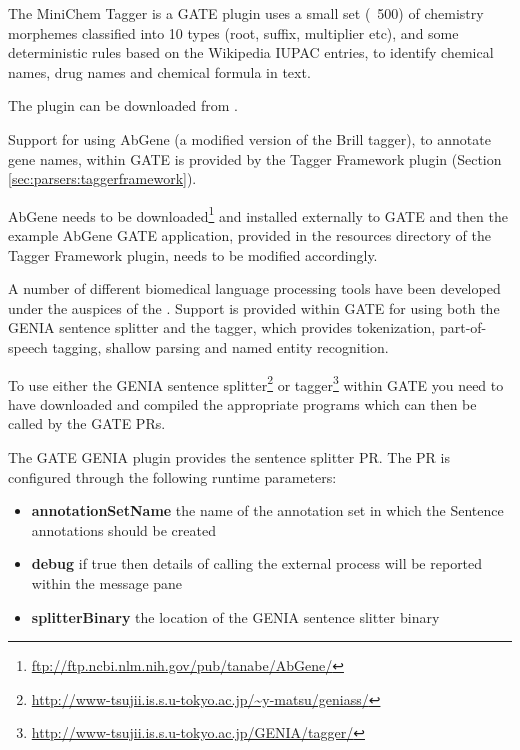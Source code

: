 The MiniChem Tagger is a GATE plugin uses a small set (~500) of chemistry morphemes classified into 10 types (root, suffix, multiplier etc), and some deterministic rules based on the Wikipedia IUPAC entries, to identify chemical names, drug names and chemical formula in text.

The plugin can be downloaded from .

Support for using AbGene \cite{Tanabe02} (a modified version of the Brill tagger), to annotate gene names,
within GATE is provided by the Tagger Framework plugin (Section \ref{sec:parsers:taggerframework}). 

AbGene needs to be downloaded\footnote{\url{ftp://ftp.ncbi.nlm.nih.gov/pub/tanabe/AbGene/}}
and installed externally to GATE and then the example AbGene GATE application, provided
in the resources directory of the Tagger Framework plugin, needs to be modified accordingly.



A number of different biomedical language processing tools have been developed under the auspices of the
. Support is provided within GATE
for using both the GENIA sentence splitter and the tagger, which provides tokenization, part-of-speech tagging,
shallow parsing and named entity recognition.

To use either the GENIA sentence splitter\footnote{\url{http://www-tsujii.is.s.u-tokyo.ac.jp/~y-matsu/geniass/}}
or tagger\footnote{\url{http://www-tsujii.is.s.u-tokyo.ac.jp/GENIA/tagger/}} within GATE you need to have downloaded
and compiled the appropriate programs which can then be called by the GATE PRs.

The GATE GENIA plugin provides the sentence splitter PR. The PR is configured through the following runtime parameters:
\begin{itemize}
\item \textbf{annotationSetName} the name of the annotation set in which the Sentence annotations should be created
\item \textbf{debug} if true then details of calling the external process will be reported within the message pane
\item \textbf{splitterBinary} the location of the GENIA sentence slitter binary
\end{itemize}

